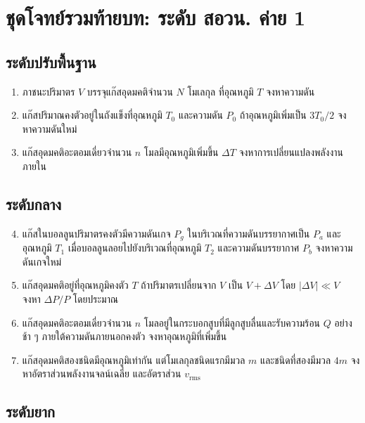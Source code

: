 \section{ชุดโจทย์รวมท้ายบท: ระดับ สอวน. ค่าย 1}

\subsection*{ระดับปรับพื้นฐาน}

\begin{enumerate}
    \item ภาชนะปริมาตร $V$ บรรจุแก๊สอุดมคติจำนวน $N$ โมเลกุล ที่อุณหภูมิ $T$ จงหาความดัน

    \item แก๊สปริมาณคงตัวอยู่ในถังแข็งที่อุณหภูมิ $T_0$ และความดัน $P_0$ ถ้าอุณหภูมิเพิ่มเป็น $3T_0/2$ จงหาความดันใหม่

    \item แก๊สอุดมคติอะตอมเดี่ยวจำนวน $n$ โมลมีอุณหภูมิเพิ่มขึ้น $\Delta T$ จงหาการเปลี่ยนแปลงพลังงานภายใน
\end{enumerate}

\subsection*{ระดับกลาง}

\begin{enumerate}
    \setcounter{enumi}{3}
    \item แก๊สในบอลลูนปริมาตรคงตัวมีความดันเกจ $P_g$ ในบริเวณที่ความดันบรรยากาศเป็น $P_a$ และอุณหภูมิ $T_1$ เมื่อบอลลูนลอยไปยังบริเวณที่อุณหภูมิ $T_2$ และความดันบรรยากาศ $P_b$ จงหาความดันเกจใหม่

    \item แก๊สอุดมคติอยู่ที่อุณหภูมิคงตัว $T$ ถ้าปริมาตรเปลี่ยนจาก $V$ เป็น $V+\Delta V$ โดย $|\Delta V|\ll V$ จงหา $\Delta P/P$ โดยประมาณ

    \item แก๊สอุดมคติอะตอมเดี่ยวจำนวน $n$ โมลอยู่ในกระบอกสูบที่มีลูกสูบลื่นและรับความร้อน $Q$ อย่างช้า ๆ ภายใต้ความดันภายนอกคงตัว จงหาอุณหภูมิที่เพิ่มขึ้น

    \item แก๊สอุดมคติสองชนิดมีอุณหภูมิเท่ากัน แต่โมเลกุลชนิดแรกมีมวล $m$ และชนิดที่สองมีมวล $4m$ จงหาอัตราส่วนพลังงานจลน์เฉลี่ย และอัตราส่วน $v_{\text{rms}}$
\end{enumerate}

\subsection*{ระดับยาก}

